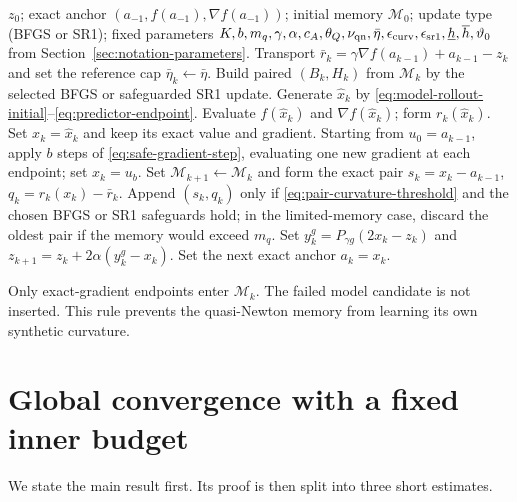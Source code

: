 \documentclass[10pt,leqno]{amsart}
\numberwithin{equation}{section}
\numberwithin{algorithm}{section}
\theoremstyle{remark}
\newcommand{\grad}{\nabla}
\begin{document}
\begin{algorithm}[t]
\caption{Certified CR-DRS with BFGS or safeguarded SR1}
\label{alg:certified-crdrs}
\begin{algorithmic}[1]
\REQUIRE $z_0$; exact anchor $(a_{-1},f(a_{-1}),\grad f(a_{-1}))$; initial memory $\mathcal M_0$; update type (BFGS or SR1); fixed parameters $K,b,m_q,\gamma,\alpha,c_A,\theta_Q,\nu_{\rm qn},\bar\eta,\epsilon_{\rm curv},\epsilon_{\rm sr1},\underline h,\overline h,\vartheta_0$ from Section~\ref{sec:notation-parameters}.
\STATE Transport $\bar r_k=\gamma\grad f(a_{k-1})+a_{k-1}-z_k$ and set the reference cap $\bar\eta_k\leftarrow\bar\eta$.
\STATE Build paired $(B_k,H_k)$ from $\mathcal M_k$ by the selected BFGS or safeguarded SR1 update.
\STATE Generate $\widehat x_k$ by \eqref{eq:model-rollout-initial}--\eqref{eq:predictor-endpoint}.
\STATE Evaluate $f(\widehat x_k)$ and $\grad f(\widehat x_k)$; form $r_k(\widehat x_k)$.
    \STATE Set $x_k=\widehat x_k$ and keep its exact value and gradient.
\ELSE
    \STATE Starting from $u_0=a_{k-1}$, apply $b$ steps of \eqref{eq:safe-gradient-step}, evaluating one new gradient at each endpoint; set $x_k=u_b$.
\ENDIF
\STATE Set $\mathcal M_{k+1}\leftarrow\mathcal M_k$ and form the exact pair
$s_k=x_k-a_{k-1}$,
$q_k=r_k(x_k)-\bar r_k$.  Append $(s_k,q_k)$ only if \eqref{eq:pair-curvature-threshold} and the chosen BFGS or SR1 safeguards hold; in the limited-memory case, discard the oldest pair if the memory would exceed $m_q$.
\STATE Set $y_k^{g}=P_{\gamma g}(2x_k-z_k)$ and
$z_{k+1}=z_k+2\alpha(y_k^{g}-x_k)$.
\STATE Set the next exact anchor $a_k=x_k$.
\ENDFOR
\end{algorithmic}
\end{algorithm}

Only exact-gradient endpoints enter $\mathcal M_k$.  The failed model candidate is not inserted.  This rule prevents the quasi-Newton memory from learning its own synthetic curvature.

\section{Global convergence with a fixed inner budget}
\label{sec:global}

We state the main result first.  Its proof is then split into three short estimates.
\end{document}
